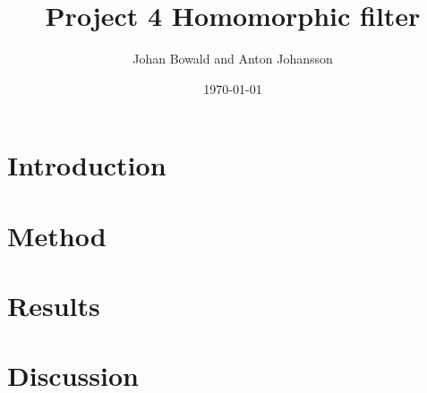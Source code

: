 \documentclass[a4paper]{article}
\title{Project 4 Homomorphic filter}
\author{Johan Bowald and Anton Johansson}
\date{\today}
\begin{document}
\maketitle

\newpage


\section{Introduction}

\section{Method}

\section{Results}

\section{Discussion}
\end{document}
